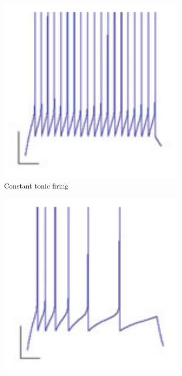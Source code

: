\begin{figure}
	\centering
	\begin{subfigure}[t]{.32\textwidth}
	 	\centering
  		\includegraphics[width=.9\linewidth]{imgs/lif_bad1.png}
  		\caption{Constant tonic firing}
	\end{subfigure}
	\begin{subfigure}[t]{.32\textwidth}
	 	\centering
  		\includegraphics[width=.9\linewidth]{imgs/lif_bad2.png}

\end{subfigure}
\end{figure}
